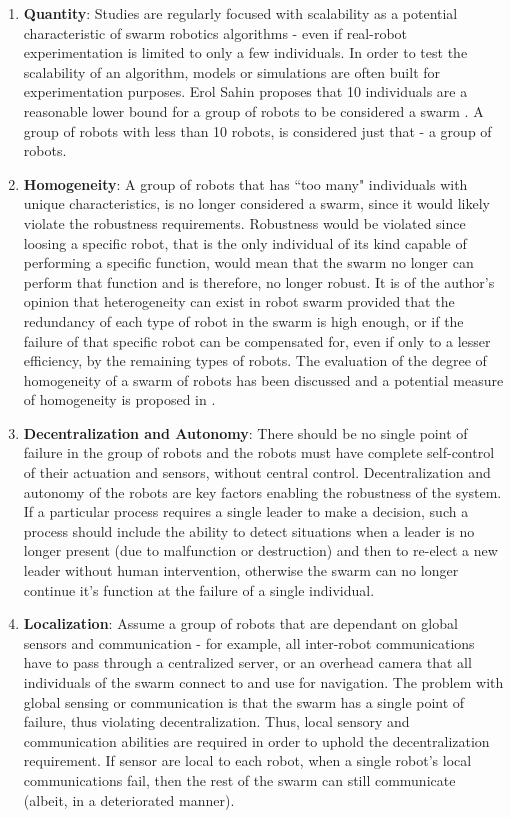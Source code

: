 \begin{enumerate}

\item \textbf{Quantity}: Studies are regularly focused with scalability as a potential characteristic of swarm robotics algorithms - even if real-robot experimentation is limited to only a few individuals. In order to test the scalability of an algorithm, models or simulations are often built for experimentation purposes. Erol Sahin proposes that 10 individuals are a reasonable lower bound for a group of robots to be considered a swarm \cite{csahin2005swarm}. A group of robots with less than 10 robots, is considered just that - a group of robots. 

\item \textbf{Homogeneity}: A group of robots that has ``too many" individuals with unique characteristics, is no longer considered a swarm, since it would likely violate the robustness requirements. Robustness would be violated since loosing a specific robot, that is the only individual of its kind capable of performing a specific function, would mean that the swarm no longer can perform that function and is therefore, no longer robust. It is of the author's opinion that heterogeneity can exist in robot swarm provided that the redundancy of each type of robot in the swarm is high enough, or if the failure of that specific robot can be compensated for, even if only to a lesser efficiency, by the remaining types of robots. The evaluation of the degree of homogeneity of a swarm of robots has been discussed and a potential measure of homogeneity is proposed in \cite{balch2000hierarchic}.

\item \textbf{Decentralization and Autonomy}: There should be no single point of failure in the group of robots and the robots must have complete self-control of their actuation and sensors, without central control. Decentralization and autonomy of the robots are key factors enabling the robustness of the system. If a particular process requires a single leader to make a decision, such a process should include the ability to detect situations when a leader is no longer present (due to malfunction or destruction) and then to re-elect a new leader without human intervention, otherwise the swarm can no longer continue it's function at the failure of a single individual.

\item \textbf{Localization}: Assume a group of robots that are dependant on global sensors and communication - for example, all inter-robot communications have to pass through a centralized server, or an overhead camera that all individuals of the swarm connect to and use for navigation. The problem with global sensing or communication is that the swarm has a single point of failure, thus violating decentralization. Thus, local sensory and communication abilities are required in order to uphold the decentralization requirement. If sensor are local to each robot, when a single robot's local communications fail, then the rest of the swarm can still communicate (albeit, in a deteriorated manner).


\end{enumerate}
